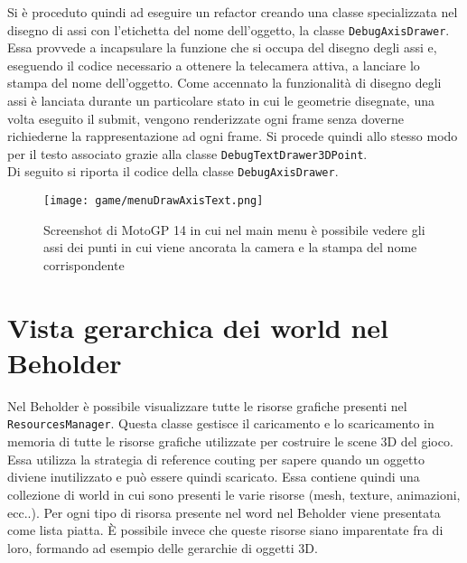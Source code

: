 Si è proceduto quindi ad eseguire un refactor creando una classe specializzata nel disegno di assi con l'etichetta del nome dell'oggetto, la classe \texttt{DebugAxisDrawer}.\\

Essa provvede a incapsulare la funzione che si occupa del disegno degli assi e, eseguendo il codice necessario a ottenere la telecamera attiva, a lanciare lo stampa del nome dell'oggetto. Come accennato la funzionalità di disegno degli assi è lanciata durante un particolare stato in cui le geometrie disegnate, una volta eseguito il submit, vengono renderizzate ogni frame senza doverne richiederne la rappresentazione ad ogni frame. Si procede quindi allo stesso modo per il testo associato grazie alla classe \texttt{DebugTextDrawer3DPoint}.\\

Di seguito si riporta il codice della classe \texttt{DebugAxisDrawer}.





\begin{figure}[h!] 
	\centering 
	\hspace*{-0.05\columnwidth}\texttt{[image: game/menuDrawAxisText.png]} 
	\caption{Screenshot di MotoGP 14 in cui nel main menu è possibile vedere gli assi dei punti in cui viene ancorata la camera e la stampa del nome corrispondente}
\end{figure}

\section{Vista gerarchica dei world nel Beholder}
	Nel Beholder è possibile visualizzare tutte le risorse grafiche presenti nel \texttt{ResourcesManager}. Questa classe gestisce il caricamento e lo scaricamento in memoria di tutte le risorse grafiche utilizzate per costruire le scene 3D del gioco. Essa utilizza la strategia di reference couting per sapere quando un oggetto diviene inutilizzato e può essere quindi scaricato. Essa contiene quindi una collezione di world in cui sono presenti le varie risorse (mesh, texture, animazioni, ecc..). Per ogni tipo di risorsa presente nel word nel Beholder viene presentata come lista piatta. È possibile invece che queste risorse siano imparentate fra di loro, formando ad esempio delle gerarchie di oggetti 3D.\\
	

